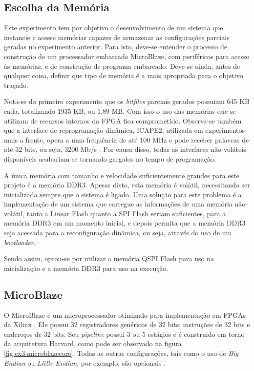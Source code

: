 \documentclass[11pt,a4paper,oneside]{book}
\begin{document}
\subsection{Escolha da Memória}
Este experimento tem por objetivo o desenvolvimento de um sistema que instancie e acesse memórias capazes de armazenar as configurações parciais geradas no experimento anterior.
Para isto, deve-se entender o processo de construção de um processador embarcado MicroBlaze, com periféricos para acesso às memórias, e de construção de programa embarcado.
Deve-se ainda, antes de qualquer coisa, definir que tipo de memória é a mais apropriada para o objetivo traçado.

Nota-se do primeiro experimento que os \textit{bitfiles} parciais gerados possuiam 645 KB cada, totalizando 1935 KB, ou 1,89 MB.
Com isso o uso das memórias que se utilizam de recursos internos da FPGA fica comprometido.
Observa-se também que a interface de reprogramação dinâmica, ICAPE2, utilizada em experimentos mais a frente, opera a uma frequência de até 100 MHz e pode receber palavras de até 32 bits, ou seja, 3200 Mb/s \cite{ug702}.
Por causa disso, todas as interfaces não-voláteis disponíveis acabariam se tornando gargalos no tempo de programação.

A única memória com tamanho e velocidade suficientemente grandes para este projeto é a memória DDR3.
Apesar disto, esta memória é volátil, necessitando ser inicializada sempre que o sistema é ligado.
Uma solução para este problema é a implementação de um sistema que carregue as informações de uma memória não-volátil, tanto a Linear Flash quanto a SPI Flash seriam suficientes, para a memória DDR3 em um momento inicial, e depois permita que a memória DDR3 seja acessada para a reconfiguração dinâmica, ou seja, através do uso de um \textit{bootloader}.

Sendo assim, optou-se por utilizar a memória QSPI Flash para uso na inicialização e a memória DDR3 para uso na execução.

\subsection{MicroBlaze}
O MicroBlaze é um microprocessador otimizado para implementação em FPGAs da Xilinx \cite{ug081}.
Ele possui 32 registradores genéricos de 32 bits, instruções de 32 bits e endereços de 32 bits.
Seu \textit{pipeline} possui 3 ou 5 estágios e é construido em torno da arquitetura Harvard, como pode ser observado na figura \ref{fig:ex3:microblazecore}.
Todas as outras configurações, tais como o uso de \textit{Big Endian} ou \textit{Little Endian}, por exemplo, são opcionais \cite{ug081}.
\end{document}
